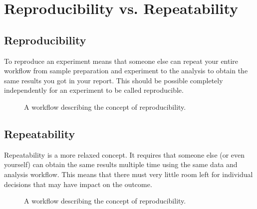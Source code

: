 \documentclass[letterpaper,10pt,english]{sphinxmanual}
\begin{document}
\section{Reproducibility vs. Repeatability}
\label{\detokenize{01-Introduction:reproducibility-vs-repeatability}}

\subsection{Reproducibility}
\label{\detokenize{01-Introduction:reproducibility}}
\sphinxAtStartPar
To reproduce an experiment means that someone else can repeat your entire workflow from sample preparation and experiment to the analysis to obtain the same results you got in your report. This should be possible completely independently for an experiment to be called reproducible.

\begin{figure}[htbp]
\centering
\capstart

\noindent{}
\caption{A workflow describing the concept of reproducibility.}\label{\detokenize{01-Introduction:id25}}\end{figure}




\subsection{Repeatability}
\label{\detokenize{01-Introduction:repeatability}}
\sphinxAtStartPar
Repeatability is a more relaxed concept. It requires that someone else (or even yourself) can obtain the same results multiple time using the same data and analysis workflow. This means that there must very little room left for individual decisions that may have impact on the outcome.

\begin{figure}[htbp]
\centering
\capstart

\noindent{}
\caption{A workflow describing the concept of reproducibility.}\label{\detokenize{01-Introduction:id26}}\end{figure}
\end{document}
